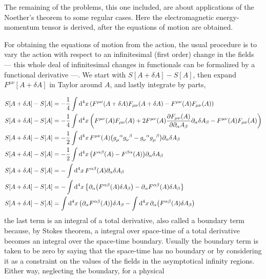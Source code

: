 \problem{}

The remaining of the problems, this one included, are about applications of the Noether's theorem to some regular cases. Here the electromagnetic 
energy-momentum tensor is derived, after the equations of motion are obtained.

\probitem{}

For obtaining the equations of motion from the action, the usual procedure is to vary the action with respect to an infinitesimal (first order)
change in the fields --- this whole deal of infinitesimal changes in functionals can be formalized by a functional derivative ---. 
We start with $S[A+\delta A]-S[A]$, then expand $F^{\mu\nu}[A+\delta A]$ in Taylor around $A$, and lastly integrate by parts,

\begin{align}
    S[A+\delta A]-S[A] &= -\frac14\int\dd[4]{x}\qty(F^{\mu\nu}\qty(A+\delta A)F_{\mu\nu}\qty(A+\delta A)-F^{\mu\nu}\qty(A)F_{\mu\nu}\qty(A))\\
    S[A+\delta A]-S[A] &= -\frac14\int\dd[4]{x}\qty(F^{\mu\nu}\qty(A)F_{\mu\nu}\qty(A)+2F^{\mu\nu}\qty(A)\pdv{F_{\mu\nu}\qty(A)}{\partial_\alpha A_\beta}\partial_\alpha\delta A_\beta-F^{\mu\nu}\qty(A)F_{\mu\nu}\qty(A))\\
    S[A+\delta A]-S[A] &= -\frac12\int\dd[4]{x}F^{\mu\nu}\qty(A)\qty(\tensor{g}{_\mu^\alpha}\tensor{g}{_\nu^\beta}-\tensor{g}{_\nu^\alpha}\tensor{g}{_\mu^\beta})\partial_\alpha\delta A_\beta\\
    S[A+\delta A]-S[A] &= -\frac12\int\dd[4]{x}\qty(F^{\alpha\beta}\qty(A)-F^{\beta\alpha}\qty(A))\partial_\alpha\delta A_\beta\\
    S[A+\delta A]-S[A] &= -\int\dd[4]{x}F^{\alpha\beta}\qty(A)\partial_\alpha\delta A_\beta\\
    S[A+\delta A]-S[A] &= -\int\dd[4]{x}\qty{\partial_\alpha\qty(F^{\alpha\beta}\qty(A)\delta A_\beta)-\partial_\alpha F^{\alpha\beta}\qty(A)\delta A_\beta}\\
    S[A+\delta A]-S[A] &= \int\dd[4]{x}\qty(\partial_\alpha F^{\alpha\beta}\qty(A))\delta A_\beta-\int\dd[4]{x}\partial_\alpha\qty(F^{\alpha\beta}\qty(A)\delta A_\beta)
\end{align}
the last term is an integral of a total derivative, also called a boundary term because, by Stokes theorem, a integral over space-time of a total derivative 
becomes an integral over the space-time boundary. Usually the boundary term is taken to be zero by saying that the space-time has no boundary or by 
considering it as a constraint on the values of the fields in the asymptotical infinity regions. Either way, neglecting the boundary, for a physical 
